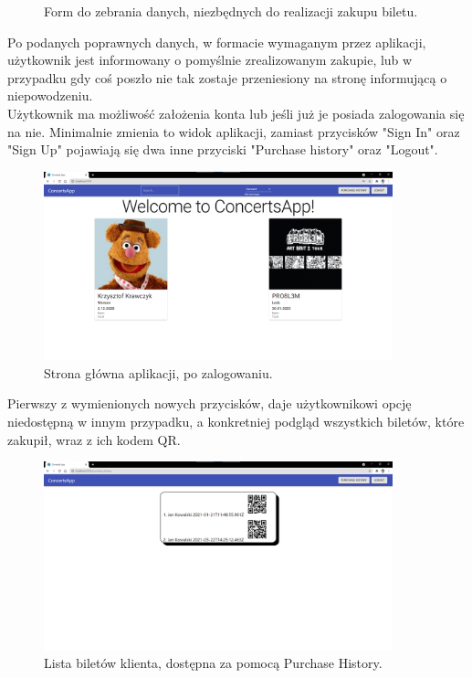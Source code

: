 \documentclass[12pt]{article}
\begin{document}
\begin{sloppypar}
{\begin{figure}[H]
    \caption{Form do zebrania danych, niezbędnych do realizacji zakupu biletu.}
    \label{fig:payment-guest}
  \end{figure}
  Po podanych poprawnych danych, w formacie wymaganym przez aplikacji, użytkownik jest informowany o pomyślnie zrealizowanym zakupie, lub w przypadku gdy coś poszło 
  nie tak zostaje przeniesiony na stronę informującą o niepowodzeniu.\\
  Użytkownik ma możliwość założenia konta lub jeśli już je posiada zalogowania się na nie. 
  Minimalnie zmienia to widok aplikacji, zamiast przycisków "Sign In" oraz "Sign Up" pojawiają się dwa inne przyciski "Purchase history" oraz "Logout".
  \begin{figure}[H]
    \centering
    \includegraphics[width=0.9\textwidth]{client_app/logged_in.png}
    \caption{Strona główna aplikacji, po zalogowaniu.}
    \label{fig:signed-in}
  \end{figure}
  Pierwszy z wymienionych nowych przycisków, daje użytkownikowi opcję niedostępną w innym przypadku, a konkretniej podgląd wszystkich biletów, które zakupił, wraz z ich kodem QR.
  \begin{figure}[H]
    \centering
    \includegraphics[width=0.9\textwidth]{client_app/purchase_history.png}
    \caption{Lista biletów klienta, dostępna za pomocą Purchase History.}

\end{figure}}
\end{sloppypar}
\end{document}
